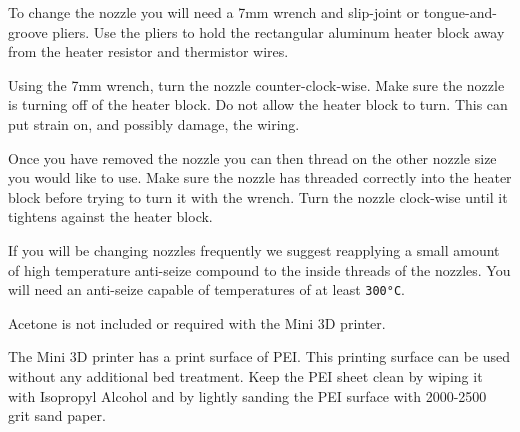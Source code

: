 To change the nozzle you will need a 7mm wrench and slip-joint or tongue-and-groove pliers. Use the pliers to hold the rectangular aluminum heater block away from the heater resistor and thermistor wires.

Using the 7mm wrench, turn the nozzle counter-clock-wise. Make sure the nozzle is turning off of the heater block. Do not allow the heater block to turn. This can put strain on, and possibly damage, the wiring.

Once you have removed the nozzle you can then thread on the other nozzle size you would like to use. Make sure the nozzle has threaded correctly into the heater block before trying to turn it with the wrench. Turn the nozzle clock-wise until it tightens against the heater block.


If you will be changing nozzles frequently we suggest reapplying a small amount of high temperature anti-seize compound to the inside threads of the nozzles. You will need an anti-seize capable of temperatures of at least \texttt{300°C}.

Acetone is not included or required with the Mini 3D printer.


The Mini 3D printer has a print surface of PEI. This printing surface can be used without any additional bed treatment. Keep the PEI sheet clean by wiping it with Isopropyl Alcohol and by lightly sanding the PEI surface with 2000-2500 grit sand paper.

